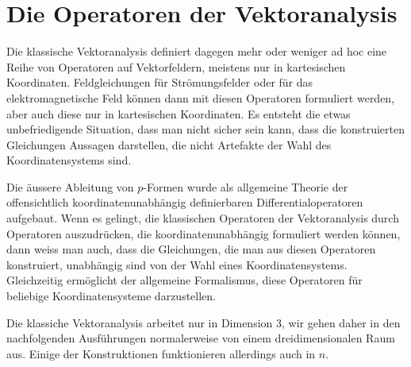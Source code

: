 %
%
%
\section{Die Operatoren der Vektoranalysis
\label{buch:hodge:section:vektoranlysis}}
Die klassische Vektoranalysis definiert dagegen mehr oder weniger
ad hoc eine Reihe von Operatoren auf Vektorfeldern, meistens nur
in kartesischen Koordinaten.
Feldgleichungen für Strömungsfelder oder für das elektromagnetische
Feld können dann mit diesen Operatoren formuliert werden, aber auch
diese nur in kartesischen Koordinaten.
Es entsteht die etwas unbefriedigende Situation, dass man nicht
sicher sein kann, dass die konstruierten Gleichungen Aussagen
darstellen, die nicht Artefakte der Wahl des Koordinatensystems
sind.

Die äussere Ableitung von $p$-Formen wurde als allgemeine Theorie
der offensichtlich koordinatenunabhängig definierbaren
Differentialoperatoren aufgebaut.
Wenn es gelingt, die klassischen Operatoren der Vektoranalysis
durch Operatoren auszudrücken, die koordinatenunabhängig formuliert
werden können, dann weiss man auch, dass die Gleichungen, die man
aus diesen Operatoren konstruiert, unabhängig sind von der Wahl
eines Koordinatensystems.
Gleichzeitig ermöglicht der allgemeine Formalismus, diese Operatoren
für beliebige Koordinatensysteme darzustellen.

Die klassiche Vektoranalysis arbeitet nur in Dimension 3, wir gehen
daher in den nachfolgenden Ausführungen normalerweise von einem
dreidimensionalen Raum aus.
Einige der Konstruktionen funktionieren allerdings auch in $n$.

%
%
